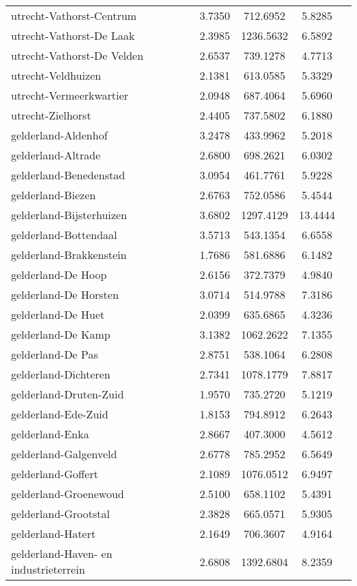 \begin{longtable}{llccc}
utrecht-Vathorst-Centrum & 3.7350 & 712.6952 & 5.8285 \\
utrecht-Vathorst-De Laak & 2.3985 & 1236.5632 & 6.5892 \\
utrecht-Vathorst-De Velden & 2.6537 & 739.1278 & 4.7713 \\
utrecht-Veldhuizen & 2.1381 & 613.0585 & 5.3329 \\
utrecht-Vermeerkwartier & 2.0948 & 687.4064 & 5.6960 \\
utrecht-Zielhorst & 2.4405 & 737.5802 & 6.1880 \\
gelderland-Aldenhof & 3.2478 & 433.9962 & 5.2018 \\
gelderland-Altrade & 2.6800 & 698.2621 & 6.0302 \\
gelderland-Benedenstad & 3.0954 & 461.7761 & 5.9228 \\
gelderland-Biezen & 2.6763 & 752.0586 & 5.4544 \\
gelderland-Bijsterhuizen & 3.6802 & 1297.4129 & 13.4444 \\
gelderland-Bottendaal & 3.5713 & 543.1354 & 6.6558 \\
gelderland-Brakkenstein & 1.7686 & 581.6886 & 6.1482 \\
gelderland-De Hoop & 2.6156 & 372.7379 & 4.9840 \\
gelderland-De Horsten & 3.0714 & 514.9788 & 7.3186 \\
gelderland-De Huet & 2.0399 & 635.6865 & 4.3236 \\
gelderland-De Kamp & 3.1382 & 1062.2622 & 7.1355 \\
gelderland-De Pas & 2.8751 & 538.1064 & 6.2808 \\
gelderland-Dichteren & 2.7341 & 1078.1779 & 7.8817 \\
gelderland-Druten-Zuid & 1.9570 & 735.2720 & 5.1219 \\
gelderland-Ede-Zuid & 1.8153 & 794.8912 & 6.2643 \\
gelderland-Enka & 2.8667 & 407.3000 & 4.5612 \\
gelderland-Galgenveld & 2.6778 & 785.2952 & 6.5649 \\
gelderland-Goffert & 2.1089 & 1076.0512 & 6.9497 \\
gelderland-Groenewoud & 2.5100 & 658.1102 & 5.4391 \\
gelderland-Grootstal & 2.3828 & 665.0571 & 5.9305 \\
gelderland-Hatert & 2.1649 & 706.3607 & 4.9164 \\
gelderland-Haven- en industrieterrein & 2.6808 & 1392.6804 & 8.2359 \\

\end{longtable}
